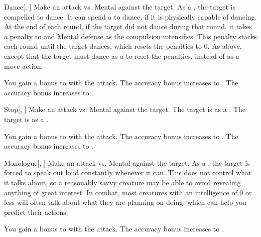 \lowercase{\hypertarget{spell:Dance}{}}\label{spell:Dance}
\begin{freeability}[Rank 1]{\hypertarget{spell:Dance}{Dance}}[, ]
Make an attack vs. Mental against the target.
\hit As a , the target is compelled to dance.
It can spend a  to dance, if it is physically capable of dancing.
At the end of each round, if the target did not dance during that round, it takes a  penalty to  and Mental defense as the compulsion intensifies.
This penalty stacks each round until the target dances, which resets the penalties to 0.
\crit As above, except that the target must dance as a  to reset the penalties, instead of as a move action.

\rankline
{} You gain a  bonus to  with the attack.
 The accuracy bonus increases to .
 The accuracy bonus increases to .
\end{freeability}
\vspace{0.25em}



\lowercase{\hypertarget{spell:Stop}{}}\label{spell:Stop}
\begin{freeability}[Rank 1]{\hypertarget{spell:Stop}{Stop}}[, ]
Make an attack vs. Mental against the target.
\hit The target is  as a .
\crit The target is  as a .

\rankline
{} You gain a  bonus to  with the attack.
 The accuracy bonus increases to .
 The accuracy bonus increases to .
\end{freeability}
\vspace{0.25em}



\lowercase{\hypertarget{spell:Monologue}{}}\label{spell:Monologue}
\begin{freeability}[Rank 3]{\hypertarget{spell:Monologue}{Monologue}}[, ]
Make an attack vs. Mental against the target.
\hit As a , the target is forced to speak out loud constantly whenever it can.
This does not control what it talks about, so a reasonably savvy creature may be able to avoid revealing anything of great interest.
In combat, most creatures with an intelligence of 0 or less will often talk about what they are planning on doing, which can help you predict their actions.

\rankline
{} You gain a  bonus to  with the attack.
 The accuracy bonus increases to .
\end{freeability}
\vspace{0.25em}



